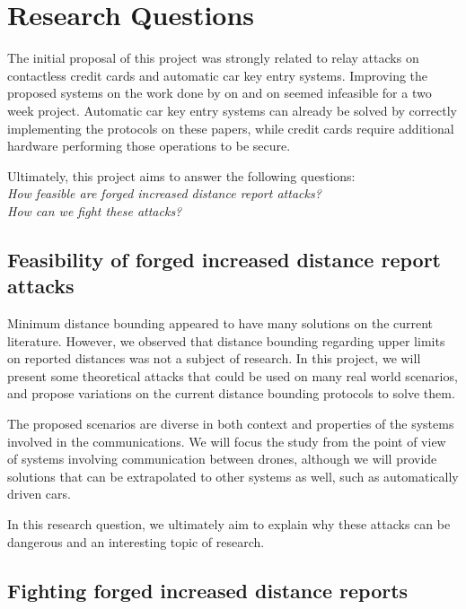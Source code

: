 \documentclass{article}
\begin{document}
\section{Research Questions}

The initial proposal of this project was strongly related to relay attacks on contactless credit cards and automatic car key entry systems. Improving the proposed systems on the work done by \citeauthor{brands1994distance} on \cite{brands1994distance} and \citeauthor{rasmussen2010realization} on \cite{rasmussen2010realization} seemed infeasible for a two week project. Automatic car key entry systems can already be solved by correctly implementing the protocols on these papers, while credit cards require additional hardware performing those operations to be secure.


Ultimately, this project aims to answer the following questions:\\

\emph{How feasible are forged increased distance report attacks?}\\

\emph{How can we fight these attacks?}

\subsection{Feasibility of forged increased distance report attacks}

Minimum distance bounding appeared to have many solutions on the current literature. However, we observed that distance bounding regarding upper limits on reported distances was not a subject of research. In this project, we will present some theoretical attacks that could be used on many real world scenarios, and propose variations on the current distance bounding protocols to solve them.

The proposed scenarios are diverse in both context and properties of the systems involved in the communications. We will focus the study from the point of view of systems involving communication between drones, although we will provide solutions that can be extrapolated to other systems as well, such as automatically driven cars.

In this research question, we ultimately aim to explain why these attacks can be dangerous and an interesting topic of research.

\subsection{Fighting forged increased distance reports}
\end{document}
